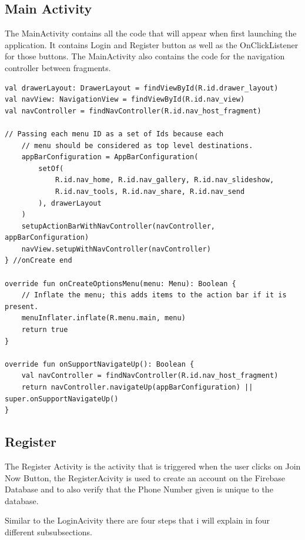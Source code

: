 \subsection{Main Activity}
The MainActivity contains all the code that will appear when first launching the application. It contains Login and Register button as well as the OnClickListener for those buttons. The MainActivity also contains the code for the navigation controller between fragments.
\begin{verbatim}
val drawerLayout: DrawerLayout = findViewById(R.id.drawer_layout)
val navView: NavigationView = findViewById(R.id.nav_view)
val navController = findNavController(R.id.nav_host_fragment)

// Passing each menu ID as a set of Ids because each
    // menu should be considered as top level destinations.
    appBarConfiguration = AppBarConfiguration(
        setOf(
            R.id.nav_home, R.id.nav_gallery, R.id.nav_slideshow,
            R.id.nav_tools, R.id.nav_share, R.id.nav_send
        ), drawerLayout
    )
    setupActionBarWithNavController(navController, appBarConfiguration)
    navView.setupWithNavController(navController)
} //onCreate end

override fun onCreateOptionsMenu(menu: Menu): Boolean {
    // Inflate the menu; this adds items to the action bar if it is present.
    menuInflater.inflate(R.menu.main, menu)
    return true
}

override fun onSupportNavigateUp(): Boolean {
    val navController = findNavController(R.id.nav_host_fragment)
    return navController.navigateUp(appBarConfiguration) || super.onSupportNavigateUp()
}

\end{verbatim}

\newpage
\subsection{Register}
The Register Activity is the activity that is triggered when the user clicks on Join Now Button, the RegisterAcivity is used to create an account on the Firebase Database and to also verify that the Phone Number given is unique to the database.\newline

Similar to the LoginAcivity there are four steps that i will explain in four different subsubsections. 


